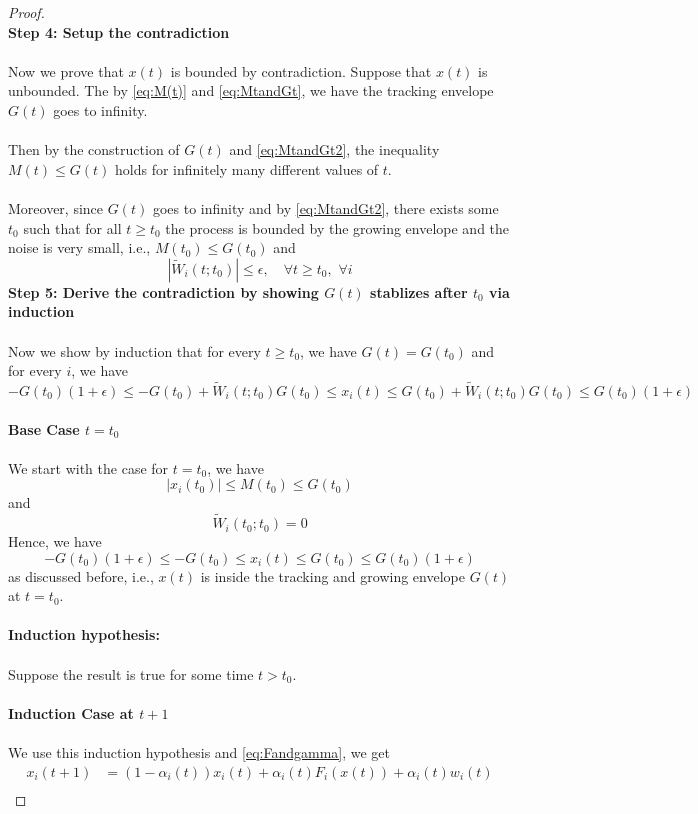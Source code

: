 \begin{proof}
\\
\textbf{Step 4: Setup the contradiction}\\
\\
Now we prove that $x(t)$ is bounded by contradiction. Suppose that $x(t)$ is unbounded. The by \autoref{eq:M(t)} and \autoref{eq:MtandGt}, we have the tracking envelope $G(t)$ goes to infinity.\\
\\
Then by the construction of $G(t)$ and \autoref{eq:MtandGt2}, the inequality $M(t)\le G(t)$ holds for infinitely many different values of $t$.\\
\\
Moreover, since $G(t)$ goes to infinity and by \autoref{eq:MtandGt2}, there exists some $t_0$ such that for all $t\ge t_0$ the process is bounded by the growing envelope and the noise is very small, i.e.,
$M(t_0)\le G(t_0)$ and
\begin{equation}\label{eq:tildeWgoesto0}
    |\tilde W_i(t;t_0)|\le \epsilon,\quad \forall t\ge t_0,\,\,\forall i
\end{equation}
\textbf{Step 5: Derive the contradiction by showing $G(t)$ stablizes after $t_0$ via induction}\\
\\
Now we show by induction that for every $t\ge t_0$, we have $G(t)=G(t_0)$ and for every $i$, we have
$$
-G(t_0)(1+\epsilon) \le -G(t_0) + \tilde W_i(t;t_0)G(t_0)\le x_i(t)\le G(t_0) + \tilde W_i(t;t_0)G(t_0)\le G(t_0)(1+\epsilon)
$$
\\
\textbf{Base Case $t=t_0$}\\
\\
We start with the case for $t=t_0$, we have
$$
|x_i(t_0)|\le M(t_0)\le G(t_0)
$$
and
$$
\tilde W_i(t_0;t_0) = 0
$$
Hence, we have
$$
-G(t_0)(1+\epsilon)\le -G(t_0)\le x_i(t) \le G(t_0)\le G(t_0)(1+\epsilon)
$$
as discussed before, i.e., $x(t)$ is inside the tracking and growing envelope $G(t)$ at $t=t_0$.\\
\\
\textbf{Induction hypothesis:}\\
\\
Suppose the result is true for some time $t>t_0$. \\
\\
\textbf{Induction Case at $t+1$}\\
\\
We use this induction hypothesis and \autoref{eq:Fandgamma}, we get
\begin{align*}
    x_i(t+1) &= (1-\alpha_i(t))x_i(t) + \alpha_i(t)F_i(x(t)) + \alpha_i(t)w_i(t)\\

\end{align*}
\end{proof}
